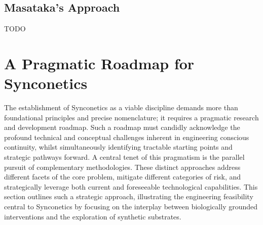 \documentclass[10pt]{article}
\begin{document}
\begin{sloppypar}
  \subsection{Masataka's Approach}
  \label{sec:masataka-approach}


  TODO


  \section{A Pragmatic Roadmap for Synconetics}
  \label{sec:roadmap}

  The establishment of Synconetics as a viable discipline demands more than foundational principles and precise nomenclature; it requires a pragmatic research and development roadmap. Such a roadmap must candidly acknowledge the profound technical and conceptual challenges inherent in engineering conscious continuity, whilst simultaneously identifying tractable starting points and strategic pathways forward. A central tenet of this pragmatism is the parallel pursuit of complementary methodologies. These distinct approaches address different facets of the core problem, mitigate different categories of risk, and strategically leverage both current and foreseeable technological capabilities. This section outlines such a strategic approach, illustrating the engineering feasibility central to Synconetics by focusing on the interplay between biologically grounded interventions and the exploration of synthetic substrates.


\end{sloppypar}
\end{document}
